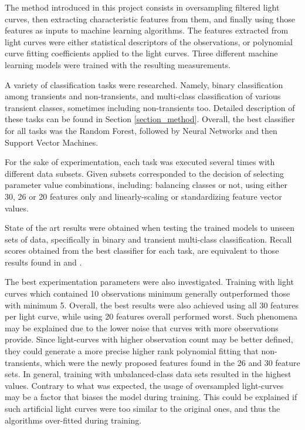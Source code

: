 \documentclass[a4paper,fleqn,usenatbib]{mnras}
\begin{document}
The method introduced in this project consists in oversampling filtered light curves, then extracting characteristic features from them, and finally using those features as inputs to machine learning algorithms. The features extracted from light curves were either statistical descriptors of the observations, or polynomial curve fitting coefficients applied to the light curves.  
Three different machine learning models were trained with the resulting measurements.

A variety of classification tasks were researched. Namely, binary classification among transients and non-transients, and multi-class classification of various transient classes, sometimes including non-transients too. Detailed description of these tasks can be found in Section \ref{section_method}. 
Overall, the best classifier for all tasks was the Random Forest, followed by Neural Networks and then Support Vector Machines.

For the sake of experimentation, each task was executed several times with different data subsets. Given subsets corresponded to the decision of selecting parameter value combinations, including: balancing classes or not, using either 30, 26 or 20 features only and linearly-scaling or standardizing feature vector values.

State of the art results were obtained when testing the trained models to unseen sets of data, specifically in binary and transient multi-class classification. Recall scores obtained from the best classifier for each task, are equivalent to those results found in \cite{1401.3211} and \cite{1601.03931}.


The best experimentation parameters were also investigated. 
Training with light curves which contained 10 observations minimum generally outperformed those with minimum 5. Overall, the best results were also achieved using all 30 features per light curve, while using 20 features overall performed worst. Such phenomena may be explained due to the lower noise that curves with more observations provide.
Since light-curves with higher observation count may be better defined, they could generate a more precise higher rank polynomial fitting that non-transients, which were the newly proposed features found in the 26 and 30 feature sets.
In general, training with unbalanced-class data sets resulted in the highest values. Contrary to what was expected, the usage of oversampled light-curves may be a factor that biases the model during training. This could be explained if such artificial light curves were too similar to the original ones, and thus the algorithms over-fitted during training.
\end{document}
